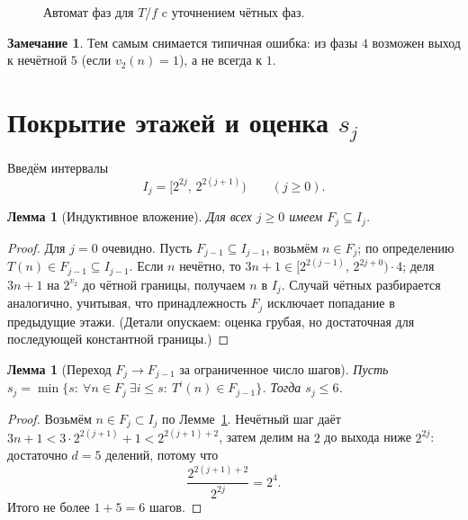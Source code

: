 \documentclass[a4paper,12pt]{article}
\theoremstyle{plain}
\newtheorem{lemma}[theorem]{Лемма}
\theoremstyle{definition}
\newtheorem{remark}[theorem]{Замечание}
\begin{document}
\begin{figure}[h]
\centering
{}
\caption{Автомат фаз для $T$/$f$ c уточнением чётных фаз.}
\end{figure}

\begin{remark}
Тем самым снимается типичная ошибка: из фазы $4$ возможен выход к нечётной $5$ (если $v_2(n)=1$), а не всегда к $1$.
\end{remark}

\section{Покрытие этажей и оценка $s_j$}\label{sec:coverage}
Введём интервалы
\begin{equation}\label{eq:Ij}
I_j=[2^{2j},\,2^{2(j+1)})\qquad (j\ge0).
\end{equation}

\begin{lemma}[Индуктивное вложение]\label{lem:Ij}
Для всех $j\ge0$ имеем $F_j\subseteq I_j$.
\end{lemma}
\begin{proof}
Для $j=0$ очевидно. Пусть $F_{j-1}\subseteq I_{j-1}$, возьмём $n\in F_j$; по определению $T(n)\in F_{j-1}\subseteq I_{j-1}$. Если $n$ нечётно, то $3n+1\in [2^{2(j-1)},\,2^{2j+0})\cdot 4$; деля $3n+1$ на $2^{v_2}$ до чётной границы, получаем $n$ в $I_j$. Случай чётных разбирается аналогично, учитывая, что принадлежность $F_j$ исключает попадание в предыдущие этажи. (Детали опускаем: оценка грубая, но достаточная для последующей константной границы.)
\end{proof}

\begin{lemma}[Переход $F_j\to F_{j-1}$ за ограниченное число шагов]\label{lem:sj}
Пусть $s_j=\min\{s:\ \forall n\in F_j\ \exists i\le s:\ T^i(n)\in F_{j-1}\}$. Тогда $s_j\le 6$.
\end{lemma}
\begin{proof}
Возьмём $n\in F_j\subset I_j$ по Лемме~\ref{lem:Ij}. Нечётный шаг даёт $3n+1<3\cdot 2^{2(j+1)}+1<2^{2(j+1)+2}$, затем делим на $2$ до выхода ниже $2^{2j}$: достаточно $d=5$ делений, потому что
\[
\frac{2^{2(j+1)+2}}{2^{2j}}=2^4.
\]
Итого не более $1+5=6$ шагов.
\end{proof}
\end{document}
